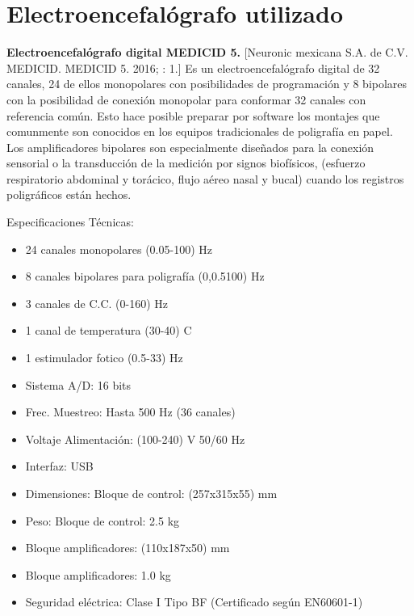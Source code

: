 
\section{Electroencefal\'ografo utilizado}

\textbf{Electroencefal\'ografo digital MEDICID 5.} 
[Neuronic mexicana S.A. de C.V. MEDICID. MEDICID 5. 2016; : 1.]
Es un electroencefal\'ografo digital de 32 canales, 24 de ellos monopolares con posibilidades de 
programaci\'on y 8 bipolares con la posibilidad de conexi\'on monopolar para conformar 32 canales 
con referencia com\'un. Esto hace posible preparar por software los montajes que comunmente son 
conocidos en los equipos tradicionales de poligraf\'ia en papel. Los amplificadores bipolares son 
especialmente dise\~nados para la conexi\'on sensorial o la transducci\'on de la medici\'on por 
signos biof\'isicos, (esfuerzo respiratorio abdominal y tor\'acico, flujo a\'ereo nasal y bucal) 
cuando los registros poligr\'aficos est\'an hechos. 

%
%
%

Especificaciones T\'ecnicas:
\begin{itemize}
\item 24 canales monopolares (0.05-100) Hz
\item 8 canales bipolares para poligraf\'ia (0,0.5100) Hz
\item 3 canales de C.C. (0-160) Hz
\item 1 canal de temperatura (30-40) C
\item 1 estimulador fotico (0.5-33) Hz
\item Sistema A/D: 16 bits
\item Frec. Muestreo: Hasta 500 Hz (36 canales)
\item Voltaje Alimentaci\'on: (100-240) V 50/60 Hz
\item Interfaz: USB
\item Dimensiones: Bloque de control: (257x315x55) mm
\item Peso: Bloque de control: 2.5 kg
\item Bloque amplificadores: (110x187x50) mm
\item Bloque amplificadores: 1.0 kg
\item Seguridad el\'ectrica: Clase I Tipo BF (Certificado según EN60601-1)
\end{itemize}

